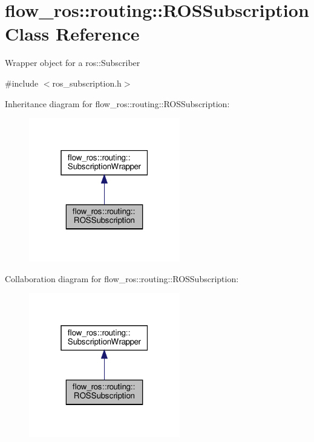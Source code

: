 \hypertarget{classflow__ros_1_1routing_1_1_r_o_s_subscription}{}\section{flow\+\_\+ros\+:\+:routing\+:\+:R\+O\+S\+Subscription Class Reference}
\label{classflow__ros_1_1routing_1_1_r_o_s_subscription}


Wrapper object for a {\ttfamily ros\+::\+Subscriber}  




{\ttfamily \#include $<$ros\+\_\+subscription.\+h$>$}



Inheritance diagram for flow\+\_\+ros\+:\+:routing\+:\+:R\+O\+S\+Subscription\+:\nopagebreak
\begin{figure}[H]
\begin{center}
\leavevmode
\includegraphics[width=187pt]{classflow__ros_1_1routing_1_1_r_o_s_subscription__inherit__graph}
\end{center}
\end{figure}


Collaboration diagram for flow\+\_\+ros\+:\+:routing\+:\+:R\+O\+S\+Subscription\+:\nopagebreak
\begin{figure}[H]
\begin{center}
\leavevmode
\includegraphics[width=187pt]{classflow__ros_1_1routing_1_1_r_o_s_subscription__coll__graph}
\end{center}
\end{figure}
